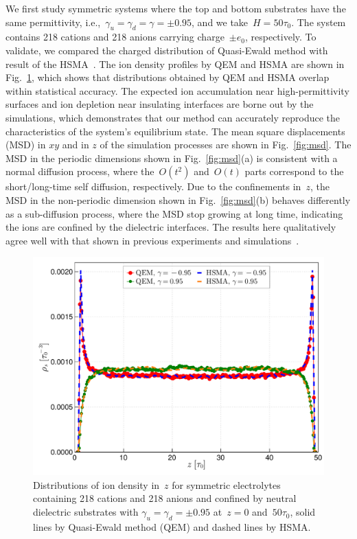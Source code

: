 We first study symmetric systems where the top and bottom substrates have the same permittivity, i.e.,~$\gamma_u = \gamma_d = \gamma = \pm 0.95$, and we take~$H = 50 \tau_0$.
The system contains 218 cations and 218 anions carrying charge~$\pm e_0$, respectively.
To validate, we compared the charged distribution of Quasi-Ewald method with result of the HSMA~\cite{liang2020harmonic}.
The ion density profiles by QEM and HSMA are shown in Fig.~\ref{fig:MD}, which shows that distributions obtained by QEM and HSMA overlap within statistical accuracy. 
The expected ion accumulation near high-permittivity surfaces and ion depletion near insulating interfaces are borne out by the simulations, which demonstrates that our method can accurately reproduce the characteristics of the system's equilibrium state.
The mean square displacements (MSD) in $xy$ and in $z$ of the simulation processes are shown in Fig.~\ref{fig:msd}.
The MSD in the periodic dimensions shown in Fig.~\ref{fig:msd}(a) is consistent with a normal diffusion process, where the~$O(t^2)$ and~$O(t)$ parts correspond to the short/long-time self diffusion, respectively.
Due to the confinements in~$z$, the MSD in the non-periodic dimension shown in Fig.~\ref{fig:msd}(b) behaves differently as a sub-diffusion process, where the MSD stop growing at long time, indicating the ions are confined by the dielectric interfaces.
The results here qualitatively agree well with that shown in previous experiments and simulations~\cite{das2010single, neusius2009subdiffusion}.

\begin{figure}[htbp]
    \centering
    \includegraphics[width = 0.8 \linewidth]{figs/compare_HSMA.pdf}
    \caption{
        Distributions of ion density in~$z$ for symmetric electrolytes containing 218 cations and 218 anions and confined by neutral dielectric substrates with $\gamma_u = \gamma_d = \pm 0.95$ at~$z = 0$ and~$50\tau_0$, solid lines by Quasi-Ewald method (QEM) and dashed lines by HSMA.
    }
    \label{fig:MD}
\end{figure}


